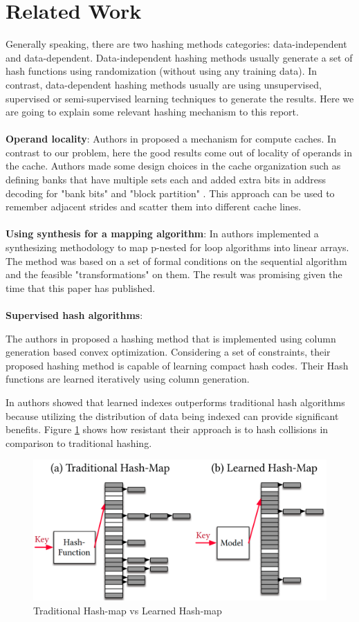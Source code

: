 \section{Related Work}
\label{related_work}
Generally speaking, there are two hashing methods categories: data-independent and data-dependent. Data-independent hashing methods usually generate a set of hash functions using randomization (without using any training data). In contrast,  data-dependent hashing methods usually are using unsupervised, supervised or semi-supervised learning techniques to generate the results. Here we are going to explain some relevant hashing mechanism to this report. 
\\
~
\\
\textbf{Operand locality}: Authors in \cite{compute-caches} proposed a mechanism for compute caches. In contrast to our problem, here the good results come out of locality of operands in the cache. Authors made some design choices in the cache organization such as defining banks that
have multiple sets each and added extra bits in address decoding for "bank bits" and "block partition" \cite{compute-caches}. This approach can be used to remember adjacent strides and scatter them into different cache lines.
\\
~
\\
\textbf{Using synthesis for a mapping algorithm}: In \cite{synthesis-map} authors implemented a synthesizing methodology to map p-nested for loop algorithms into linear arrays. The method was based on a set of formal conditions on the sequential algorithm and the feasible "transformations" on them. The result was promising given the time that this paper has published.
\\
~
\\
\textbf{Supervised hash algorithms}:

The authors in \cite{learning-hash} proposed a hashing method that is implemented using column generation based convex optimization. Considering a set of constraints, their proposed hashing method is capable of learning compact hash codes. Their Hash functions are learned iteratively using column generation.

In \cite{learning-index} authors showed that learned indexes outperforms traditional hash algorithms because utilizing the distribution of data being indexed can provide significant benefits. Figure \ref{fig:learned_index} shows how resistant their approach is to hash collisions in comparison to traditional hashing. 

\begin{figure}[h!]
	\includegraphics[scale=0.2]{figures/learned_index.png}
	\caption{Traditional Hash-map vs Learned Hash-map \cite{learning-index}}
	\label{fig:learned_index}
\end{figure}

\vspace{1mm}
\noindent